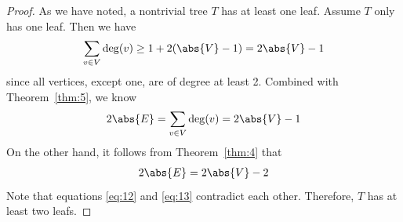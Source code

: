 \documentclass[thmcnt=section, 12pt, color=cyan]{my-elegantbook}
\begin{document}
\begin{proof}
	As we have noted, 
	a nontrivial tree $T$ has at least one leaf.
	Assume $T$ only has one leaf.
	Then we have 
	\begin{align*}
		\sum_{v \in V} \deg(v)
		\geq 1 + 2 (\abs{V} - 1)
		= 2 \abs{V} - 1
	\end{align*}
	since all vertices, except one, 
	are of degree at least 2.
	Combined with Theorem~\ref{thm:5}, we know 
	\begin{align}	
		2\abs{E} = \sum_{v \in V} \deg(v)
		= 2 \abs{V} - 1
		\label{eq:12}
	\end{align}
	On the other hand, it follows from Theorem~\ref{thm:4} that 
	\begin{align}
		2\abs{E} = 2 \abs{V} - 2
		\label{eq:13}
	\end{align}
	Note that equations \eqref{eq:12} and \eqref{eq:13}
	contradict each other. 
	Therefore, $T$ has at least two leafs.
\end{proof}


\printbibliography[heading=bibintoc, title=References]


\printindex

\end{document}
